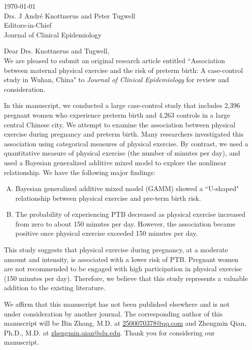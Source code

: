 \documentclass[10pt]{article}
\begin{document}
\noindent

\today\\
Drs. J Andr{\'e} Knottnerus and Peter Tugwell\\
Editors-in-Chief\\
Journal of Clinical Epidemiology

\vspace*{\fill}

Dear Drs. Knottnerus and Tugwell,\\

We are pleased to submit an original research article entitled ``Association between maternal physical exercise and the risk of preterm birth: A case-control study in Wuhan, China" to \textit{Journal of Clinical Epidemiology} for review and consideration.

In this manuscript, we conducted a large case-control study that includes 2,396 pregnant women who experience preterm birth and 4,263 controls in a large central Chinese city. We attempt to examine the association between physical exercise during pregnancy and preterm birth. Many researchers investigated this association using categorical measures of physical exercise. By contrast, we used a quantitative measure of physical exercise (the number of minutes per day), and used a Bayesian generalized additive mixed model to explore the nonlinear relationship. We have the following major findings:

\begin{enumerate}[(A)]
	\item Bayesian generalized additive mixed model (GAMM) showed a ``U-shaped" relationship between physical
	exercise and pre-term birth risk.
	\item The probability of experiencing PTB decreased as physical exercise increased from zero to about 150 minutes per day. However, the association became positive once physical exercise exceeded 150 minutes per day.
\end{enumerate}

This study suggests that physical exercise during pregnancy, at a moderate amount and intensity, is associated with a lower risk of PTB. Pregnant women are not recommended to be engaged with high participation in physical exercise (150 minutes per day). Therefore, we believe that this study represents a valuable addition to the existing literature.

We affirm that this manuscript has not been published elsewhere and is not under consideration by another journal. The corresponding author of this manuscript will be Bin Zhang, M.D. at \href{mailto:2500070378@qq.com}{2500070378@qq.com} and Zhengmin Qian, Ph.D., M.D. at \href{mailto:zhengmin.qian@slu.edu}{zhengmin.qian@slu.edu}. Thank you for considering our
manuscript.
\end{document}
